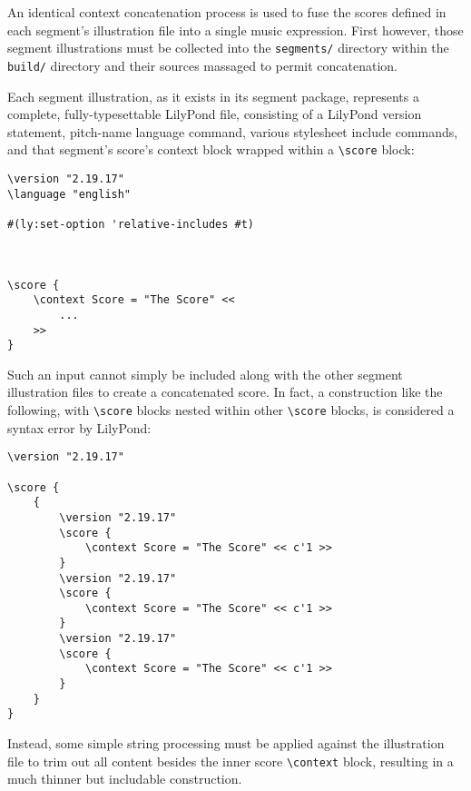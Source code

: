 \noindent An identical context concatenation process is used to fuse the scores
defined in each segment's illustration file into a single music expression.
First however, those segment illustrations must be collected into the
\texttt{segments/} directory within the \texttt{build/} directory and their
sources massaged to permit concatenation.

Each segment illustration, as it exists in its segment package, represents a
complete, fully-typesettable LilyPond file, consisting of a LilyPond version
statement, pitch-name language command, various stylesheet include commands,
and that segment's score's context block wrapped within a
\texttt{\textbackslash{}score} block:

\begin{singlespacing}
\vspace{-0.5\baselineskip}
\begin{verbatim}
\version "2.19.17"
\language "english"

#(ly:set-option 'relative-includes #t)



\score {
    \context Score = "The Score" <<
        ...
    >>
}
\end{verbatim}
\end{singlespacing}

\noindent Such an input cannot simply be included along with the other segment
illustration files to create a concatenated score. In fact, a construction like
the following, with \texttt{\textbackslash{}score} blocks nested within other
\texttt{\textbackslash{}score} blocks, is considered a syntax error by
LilyPond:

\begin{singlespacing}
\vspace{-0.5\baselineskip}
\begin{verbatim}
\version "2.19.17"

\score {
    {
        \version "2.19.17"
        \score {
            \context Score = "The Score" << c'1 >>
        }
        \version "2.19.17"
        \score {
            \context Score = "The Score" << c'1 >>
        }
        \version "2.19.17"
        \score {
            \context Score = "The Score" << c'1 >>
        }
    }
}
\end{verbatim}
\end{singlespacing}

\noindent Instead, some simple string processing must be applied against the
illustration file to trim out all content besides the inner score
\texttt{\textbackslash{}context} block, resulting in a much thinner but
includable construction.

